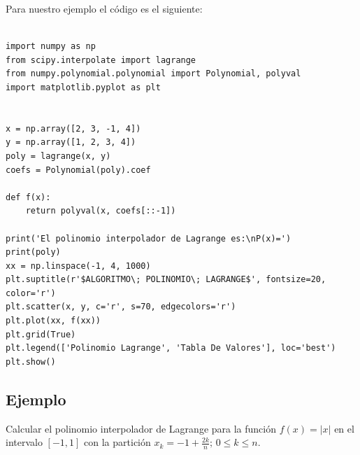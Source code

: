 \documentclass[12pt,a4paper,oneside]{scrbook}
\newcounter{ns}
\begin{document}
Para nuestro ejemplo el código es el siguiente:\\ \\
\begin{lstlisting}[frame=none]
import numpy as np
from scipy.interpolate import lagrange
from numpy.polynomial.polynomial import Polynomial, polyval
import matplotlib.pyplot as plt


x = np.array([2, 3, -1, 4])
y = np.array([1, 2, 3, 4])
poly = lagrange(x, y)
coefs = Polynomial(poly).coef

def f(x):
    return polyval(x, coefs[::-1])

print('El polinomio interpolador de Lagrange es:\nP(x)=')
print(poly)
xx = np.linspace(-1, 4, 1000)
plt.suptitle(r'$ALGORITMO\; POLINOMIO\; LAGRANGE$', fontsize=20, color='r')
plt.scatter(x, y, c='r', s=70, edgecolors='r')
plt.plot(xx, f(xx))
plt.grid(True)
plt.legend(['Polinomio Lagrange', 'Tabla De Valores'], loc='best')
plt.show()
\end{lstlisting}
\subsection*{Ejemplo}
Calcular el polinomio interpolador de Lagrange para la función $f(x)=|x|$ en el intervalo $[-1,1]$ con la partición $x_k=-1+\frac{2k}{n};\,0\leq k\leq n$.
\end{document}
